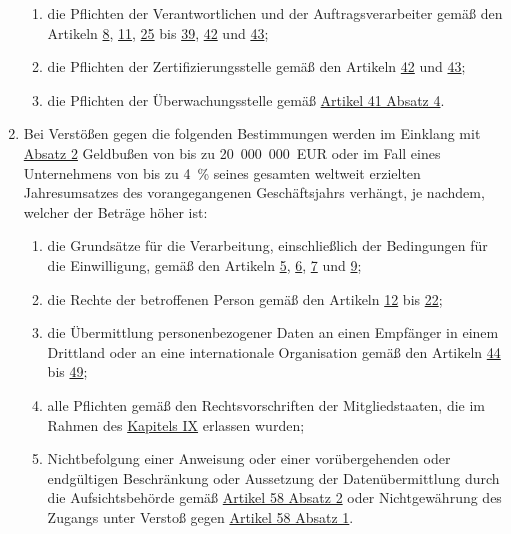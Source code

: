 \begin{enumerate}
  \begin{enumerate}
  
    \item die Pflichten der Verantwortlichen und der Auftragsverarbeiter gemäß den Artikeln \hyperref[ch:8]{8},
     \hyperref[ch:11]{11}, \hyperref[ch:25]{25} bis \hyperref[ch:39]{39}, \hyperref[ch:42]{42} und \hyperref[ch:43]{43};
    \label{itm:83-4a}

    \item die Pflichten der Zertifizierungsstelle gemäß den Artikeln \hyperref[ch:42]{42} und \hyperref[ch:43]{43};
    \label{itm:83-4b}

    \item die Pflichten der Überwachungsstelle gemäß \hyperref[itm:41-4]{Artikel 41 Absatz 4}.
    \label{itm:83-4c}

  \end{enumerate}

  \item Bei Verstößen gegen die folgenden Bestimmungen werden im Einklang mit \hyperref[itm:83-2]{Absatz 2} Geldbußen
   von bis zu 20~000~000~EUR oder im Fall eines Unternehmens von bis zu 4~\% seines gesamten weltweit erzielten
   Jahresumsatzes des vorangegangenen Geschäftsjahrs verhängt, je nachdem, welcher der Beträge höher ist:
  \label{itm:83-5}

  \begin{enumerate}
  
    \item die Grundsätze für die Verarbeitung, einschließlich der Bedingungen für die Einwilligung, gemäß den Artikeln
     \hyperref[ch:5]{5}, \hyperref[ch:6]{6}, \hyperref[ch:7]{7} und \hyperref[ch:9]{9};
    \label{itm:83-5a}

    \item die Rechte der betroffenen Person gemäß den Artikeln \hyperref[ch:12]{12} bis \hyperref[ch:22]{22};
    \label{itm:83-5b}

    \item die Übermittlung personenbezogener Daten an einen Empfänger in einem Drittland oder an eine internationale
     Organisation gemäß den Artikeln \hyperref[ch:44]{44} bis \hyperref[ch:49]{49};
    \label{itm:83-5c}

    \item alle Pflichten gemäß den Rechtsvorschriften der Mitgliedstaaten, die im Rahmen des \hyperref[part:9]
     {Kapitels IX} erlassen wurden;
    \label{itm:83-5d}

    \item Nichtbefolgung einer Anweisung oder einer vorübergehenden oder endgültigen Beschränkung oder Aussetzung der
     Datenübermittlung durch die Aufsichtsbehörde gemäß \hyperref[itm:58-2]{Artikel 58 Absatz 2} oder Nichtgewährung
     des Zugangs unter Verstoß gegen \hyperref[itm:58-1]{Artikel 58 Absatz 1}.
    \label{itm:83-5e}


\end{enumerate}
\end{enumerate}
